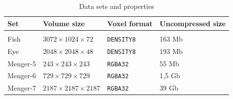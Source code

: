 \begin{table}
\centering
\begin{tabular}{l l l l}
Set & Volume size & Voxel format & Uncompressed size \\
\hline \\
Fish & $3072 \times 1024 \times 72$ & \texttt{DENSITY8} & 163 Mb \\
Eye & $2048 \times 2048 \times 48$ & \texttt{DENSITY8} & 193 Mb \\
Menger-5 & $243 \times 243 \times 243$ & \texttt{RGBA32} & 55 Mb \\
Menger-6 & $729 \times 729 \times 729$ & \texttt{RGBA32} & 1,5 Gb \\
Menger-7 & $2187 \times 2187 \times 2187$ & \texttt{RGBA32} & 39 Gb
\end{tabular}
\caption{Data sets and properties}
\label{tab:sizes}
\end{table}

\clearpage

